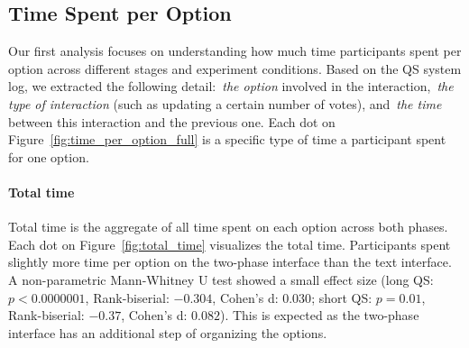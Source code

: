 \begin{figure}[htbp]
{\begin{minipage}{0.7\pdfpageheight}
\begin{subfigure}[b]{0.24\pdfpageheight}
                \label{fig:vote_time}
            \end{subfigure}
        \end{minipage}
    }
\end{figure}


\subsection{Time Spent per Option}
\label{sec:time_per_option}
Our first analysis focuses on understanding how much time participants spent per option across different stages and experiment conditions. Based on the QS system log, we extracted the following detail:~\textit{the option}  involved in the interaction,~\textit{the type of interaction} (such as updating a certain number of votes), and~\textit{the time} between this interaction and the previous one. Each dot on Figure~\ref{fig:time_per_option_full} is a specific type of time a participant spent for one option. 

\paragraph{Total time} Total time is the aggregate of all time spent on each option across both phases. Each dot on Figure~\ref{fig:total_time} visualizes the total time. Participants spent slightly more time per option on the two-phase interface than the text interface. A non-parametric Mann-Whitney U test showed a small effect size (long QS: $p<0.0000001$, Rank-biserial: $-0.304$, Cohen's d: $0.030$; short QS: $p=0.01$, Rank-biserial: $-0.37$, Cohen's d: $0.082$). This is expected as the two-phase interface has an additional step of organizing the options. 

